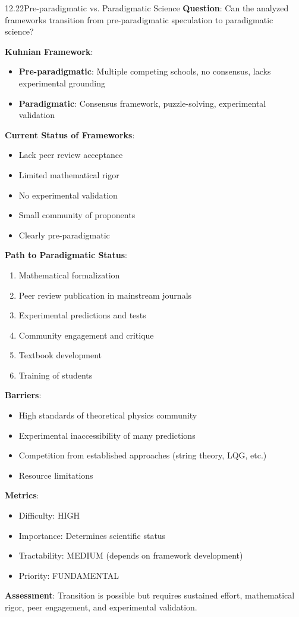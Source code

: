 \begin{openproblem}{12.22}{Pre-paradigmatic vs. Paradigmatic Science}
\textbf{Question}: Can the analyzed frameworks transition from pre-paradigmatic speculation to paradigmatic science?

\textbf{Kuhnian Framework}:
\begin{itemize}
    \item \textbf{Pre-paradigmatic}: Multiple competing schools, no consensus, lacks experimental grounding
    \item \textbf{Paradigmatic}: Consensus framework, puzzle-solving, experimental validation
\end{itemize}

\textbf{Current Status of Frameworks}:
\begin{itemize}
    \item Lack peer review acceptance
    \item Limited mathematical rigor
    \item No experimental validation
    \item Small community of proponents
    \item Clearly pre-paradigmatic
\end{itemize}

\textbf{Path to Paradigmatic Status}:
\begin{enumerate}
    \item Mathematical formalization
    \item Peer review publication in mainstream journals
    \item Experimental predictions and tests
    \item Community engagement and critique
    \item Textbook development
    \item Training of students
\end{enumerate}

\textbf{Barriers}:
\begin{itemize}
    \item High standards of theoretical physics community
    \item Experimental inaccessibility of many predictions
    \item Competition from established approaches (string theory, LQG, etc.)
    \item Resource limitations
\end{itemize}

\textbf{Metrics}:
\begin{itemize}
    \item Difficulty: HIGH
    \item Importance: Determines scientific status
    \item Tractability: MEDIUM (depends on framework development)
    \item Priority: FUNDAMENTAL
\end{itemize}

\textbf{Assessment}: Transition is possible but requires sustained effort, mathematical rigor, peer engagement, and experimental validation.
\end{openproblem}

